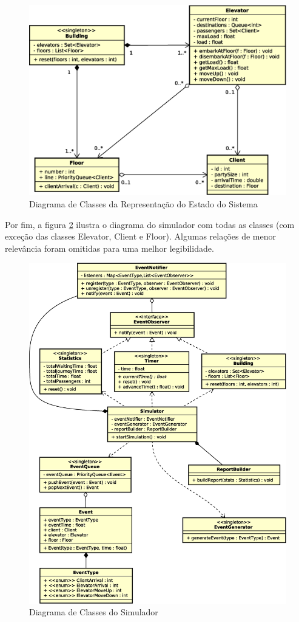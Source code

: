 \begin{figure}[htb!]
  \centering
  \includegraphics[scale=0.6]{img/state.eps}
  \caption{Diagrama de Classes da Representação do Estado do Sistema}
\label{fig:diagram:system}
\end{figure}

Por fim, a figura \ref{fig:diagram:simulator} ilustra o diagrama do simulador
com todas as classes (com exceção das classes Elevator, Client e Floor). Algumas
relações de menor relevância foram omitidas para uma melhor legibilidade.

\begin{figure}[htb!]
  \centering
  \includegraphics[scale=0.6]{img/simulator.eps}
  \caption{Diagrama de Classes do Simulador}
\label{fig:diagram:simulator}
\end{figure}


